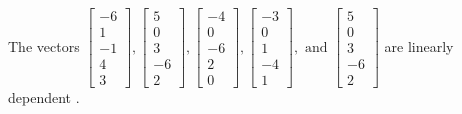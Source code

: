 \begin{exercise}
\begin{exerciseStatement}
  \end{exerciseStatement}
  \begin{exerciseAnswer}
   The vectors \(\left[\begin{array}{r}
-6 \\
1 \\
-1 \\
4 \\
3
\end{array}\right] , \left[\begin{array}{r}
5 \\
0 \\
3 \\
-6 \\
2
\end{array}\right] , \left[\begin{array}{r}
-4 \\
0 \\
-6 \\
2 \\
0
\end{array}\right] , \left[\begin{array}{r}
-3 \\
0 \\
1 \\
-4 \\
1
\end{array}\right] , \text{ and } \left[\begin{array}{r}
5 \\
0 \\
3 \\
-6 \\
2
\end{array}\right]\) are 
  	 linearly dependent  .
  


  \end{exerciseAnswer}
\end{exercise}